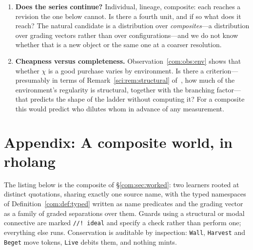 \begin{enumerate}[itemsep=4pt]
\item \textbf{Does the series continue?}\label{com:op:series} Individual, lineage, composite: each
reaches a revision the one below cannot. Is there a fourth unit, and if so what does it reach?
The natural candidate is a distribution over \emph{composites}---a distribution over grading
vectors rather than over configurations---and we do not know whether that is a new object or the
same one at a coarser resolution.

\item \textbf{Cheapness versus completeness.} Observation~\ref{com:obs:env} shows that whether $\chi$
is a good purchase varies by environment. Is there a criterion---presumably in terms of Remark~\ref{sci:rem:structural}
of~\chSci, how much of the environment's regularity is structural, together with the
branching factor---that predicts the shape of the ladder without computing it? For a composite
this would predict who dilutes whom in advance of any measurement.
\end{enumerate}


\section{Appendix: A composite world, in rholang}\label{com:app:world}\label{com:S16}

The listing below is the composite of \S\ref{com:sec:worked}: two learners rooted at distinct
quotations, sharing exactly one source name, with the typed namespaces of
Definition~\ref{com:def:typed} written as name predicates and the grading vector as a family of
graded separations over them. Guards using a structural or modal connective are marked
\texttt{//!\ ideal} and specify a check rather than perform one; everything else runs.
Conservation is auditable by inspection: \texttt{Wall}, \texttt{Harvest} and \texttt{Beget} move
tokens, \texttt{Live} debits them, and nothing mints.

